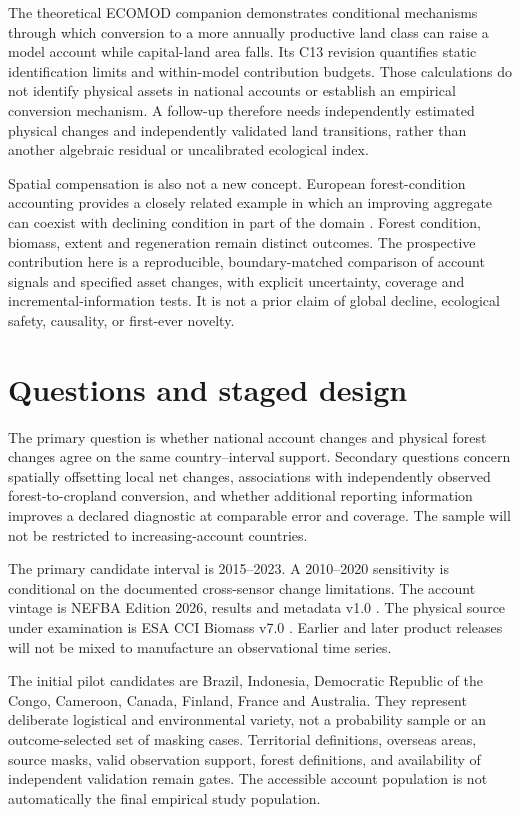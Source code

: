 \documentclass[11pt,a4paper]{article}
\begin{document}
The theoretical ECOMOD companion demonstrates conditional mechanisms through which conversion to a more annually productive land class can raise a model account while capital-land area falls. Its C13 revision quantifies static identification limits and within-model contribution budgets. Those calculations do not identify physical assets in national accounts or establish an empirical conversion mechanism. A follow-up therefore needs independently estimated physical changes and independently validated land transitions, rather than another algebraic residual or uncalibrated ecological index.

Spatial compensation is also not a new concept. European forest-condition accounting provides a closely related example in which an improving aggregate can coexist with declining condition in part of the domain \citep{Maes2023}. Forest condition, biomass, extent and regeneration remain distinct outcomes. The prospective contribution here is a reproducible, boundary-matched comparison of account signals and specified asset changes, with explicit uncertainty, coverage and incremental-information tests. It is not a prior claim of global decline, ecological safety, causality, or first-ever novelty.

\section{Questions and staged design}
The primary question is whether national account changes and physical forest changes agree on the same country--interval support. Secondary questions concern spatially offsetting local net changes, associations with independently observed forest-to-cropland conversion, and whether additional reporting information improves a declared diagnostic at comparable error and coverage. The sample will not be restricted to increasing-account countries.

The primary candidate interval is 2015--2023. A 2010--2020 sensitivity is conditional on the documented cross-sensor change limitations. The account vintage is NEFBA Edition 2026, results and metadata v1.0 \citep{Lo2026}. The physical source under examination is ESA CCI Biomass v7.0 \citep{SantoroCartus2026}. Earlier and later product releases will not be mixed to manufacture an observational time series.

The initial pilot candidates are Brazil, Indonesia, Democratic Republic of the Congo, Cameroon, Canada, Finland, France and Australia. They represent deliberate logistical and environmental variety, not a probability sample or an outcome-selected set of masking cases. Territorial definitions, overseas areas, source masks, valid observation support, forest definitions, and availability of independent validation remain gates. The accessible account population is not automatically the final empirical study population.
\end{document}
